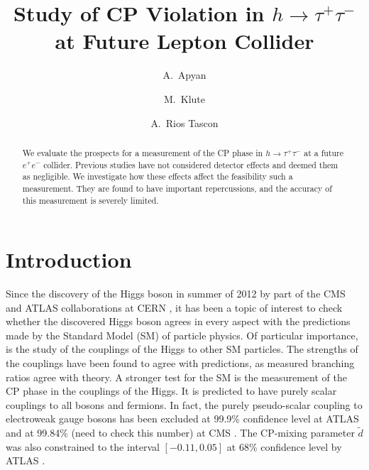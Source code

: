 \documentclass[preprintnumbers,nofootinbib,noshowpacs,eqsecnum,prd,superscriptaddress,letterpaper]{revtex4}
\begin{document}
\title{Study of CP Violation in $h \rightarrow \tau^+\tau^-$ at Future
Lepton Collider}

\author{A.~Apyan}
\author{M.~Klute}
\author{A.~Rios Tascon}

\begin{abstract} 
We evaluate the prospects for a measurement of the CP phase in $h\rightarrow\tau^+\tau^-$ at a future $e^+e^-$ collider. Previous studies have not considered detector effects and deemed them as negligible. We investigate how these effects affect the feasibility such a measurement. They are found to have important repercussions, and the accuracy of this measurement is severely limited.
\end{abstract}

\maketitle
\tableofcontents
\newpage

\section{Introduction}
\label{sec:intro}

Since the discovery of the Higgs boson in summer of 2012 by part of the CMS and ATLAS collaborations at CERN \cite{discovery}, it has been a topic of interest to check whether the discovered Higgs boson agrees in every aspect with the predictions made by the Standard Model (SM) of particle physics. Of particular importance, is the study of the couplings of the Higgs to other SM particles. The strengths of the couplings have been found to agree with predictions, as measured branching ratios agree with theory. A stronger test for the SM is the measurement of the CP phase in the couplings of the Higgs. It is predicted to have purely scalar couplings to all bosons and fermions. In fact, the purely pseudo-scalar coupling to electroweak gauge bosons has been excluded at 99.9\% confidence level at ATLAS \cite{atlas_cp1} and at 99.84\% (need to check this number) at CMS \cite{cms_cp}. The CP-mixing parameter $\tilde{d}$ was also constrained to the interval $[-0.11,0.05]$ at 68\% confidence level by ATLAS \cite{atlas_cp2}.\\
\end{document}
